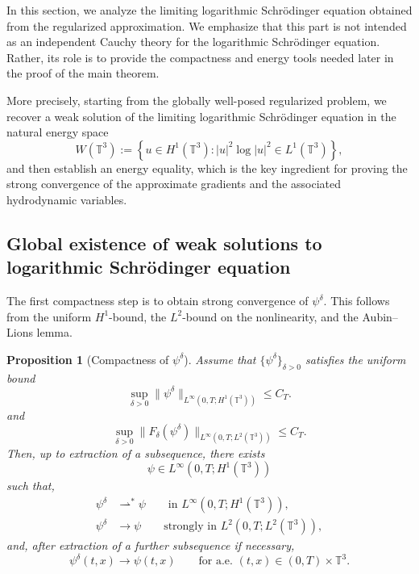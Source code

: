 \documentclass[11pt]{article}
\newtheorem{proposition}{Proposition}
\begin{document}
In this section, we analyze the limiting logarithmic Schr\"odinger equation obtained from the regularized approximation. We emphasize that this part is not intended as an independent Cauchy theory for the logarithmic Schr\"odinger equation. Rather, its role is to provide the compactness and energy tools needed later in the proof of the main theorem. 

\medskip

More precisely, starting from the globally well-posed regularized problem, we recover a weak solution of the limiting logarithmic Schr\"odinger equation in the natural energy space
\[
W(\mathbb T^3):=\left\{u\in H^1(\mathbb T^3): |u|^2\log |u|^2\in L^1(\mathbb T^3)\right\},
\]
and then establish an energy equality, which is the key ingredient for proving the strong  convergence of the approximate gradients and the associated hydrodynamic variables. 






\medskip




\subsection{Global existence of weak solutions to logarithmic Schr\"odinger equation}


The first compactness step is to obtain strong convergence of \(\psi^\delta\). This follows from the uniform \(H^1\)-bound, the  \(L^2\)-bound on the nonlinearity, and the Aubin--Lions lemma.

\begin{proposition}[Compactness of \(\psi^\delta\)]\label{prop:compactness}
Assume that \(\{\psi^\delta\}_{\delta>0}\) satisfies the uniform bound
\begin{equation}\label{uniform-H1}
\sup_{\delta>0}\|\psi^\delta\|_{L^\infty(0,T;H^1(\mathbb{T}^3))}\le C_T.
\end{equation}
and 
\begin{equation}\label{assum eq:uniform-F}
\sup_{\delta>0}\|F_\delta(\psi^\delta)\|_{L^\infty(0,T;L^2(\mathbb{T}^3))}\le C_{T}.
\end{equation}
Then, up to extraction of a subsequence, there exists
\[
\psi\in L^\infty(0,T;H^1(\mathbb{T}^3))
\]
such that, 
\begin{align}
\psi^\delta &\rightharpoonup^\ast \psi
\qquad \text{in }L^\infty(0,T;H^1(\mathbb{T}^3)), \label{eq:weak-star-H1}\\
\psi^\delta &\to \psi
\qquad \text{strongly in }L^2(0,T;L^2(\mathbb{T}^3)), \label{eq:strong-L2-local}
\end{align}
and, after extraction of a further subsequence if necessary,
\begin{equation}\label{eq:ae-conv}
\psi^\delta(t,x)\to\psi(t,x)
\qquad\text{for a.e. }(t,x)\in(0,T)\times \mathbb{T}^3.
\end{equation}
\end{proposition}
\end{document}
